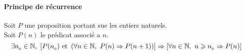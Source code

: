 \documentclass[12pt,twoside,a4paper]{article}
\begin{document}
		\begin{coro}
			\textbf{Principe de récurrence}\\
			\\
			Soit $P$ une proposition portant sue les entiers naturels.\\
			Soit $P(n)$ le prédicat associé a $n$.\\
			$$\exists n\uu0\in\mathbb{N},\ \left[P(n\uu0)\text{ et }\left(\forall n\in\mathbb{N},\ P(n)\Rightarrow P(n+1)\right)\right]\Rightarrow\left[\forall n\in\mathbb{N},\ n\geqslant n\uu0\Rightarrow P(n)\right]$$
		\end{coro}
\end{document}
